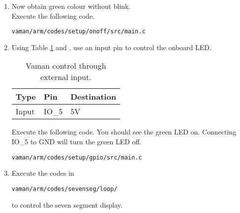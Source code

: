 \begin{enumerate}[label=\arabic*.,ref=\theenumi]
\item Now obtain green colour without blink.
\\
\solution Execute the following code.
\begin{lstlisting}
vaman/arm/codes/setup/onoff/src/main.c
\end{lstlisting}
%
\item  Using Table  \ref{tab:vaman/arm/setup/input} and 
,
 use an input pin to control the onboard LED.  

\begin{table}[]
\centering
\begin{tabular}{|l|l|l|}
\hline
Type & Pin  &  Destination\\ \hline
Input &  IO\_5 &  5V\\ \hline
\end{tabular}
\caption{Vaman control through external input.}
\label{tab:vaman/arm/setup/input}
\end{table}
\iffalse
\begin{figure*}[!ht]
\centering
\texttt{[image: vaman/arm/setup/figs/pin\_sheet.png]}
\caption{Pin Diagram}
\label{fig:vaman/arm/setup/pin_sheet}
\end{figure*}
\fi
\solution Execute the following code.  You should see the green LED on.   Connecting IO\_5 to GND will turn the green LED off.
\begin{lstlisting}
vaman/arm/codes/setup/gpio/src/main.c
\end{lstlisting}
\item Execute the codes in 
\begin{lstlisting}
vaman/arm/codes/sevenseg/loop/
\end{lstlisting}
to control the seven segment display.

\end{enumerate}


